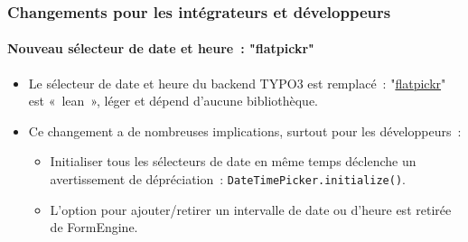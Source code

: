 %

\begin{frame}[fragile]
	\frametitle{Changements pour les intégrateurs et développeurs}
	\framesubtitle{Nouveau sélecteur de date et heure~: "flatpickr"}

	\lstset{basicstyle=\tiny\ttfamily}

	\begin{itemize}
		\item Le sélecteur de date et heure du backend TYPO3 est remplacé~:\newline
			"\href{https://flatpickr.js.org/}{flatpickr}"
			est «~lean~», léger et dépend d'aucune bibliothèque.
		\item Ce changement a de nombreuses implications, surtout pour les développeurs~:

			\begin{itemize}\small
				\item Initialiser tous les sélecteurs de date en même temps déclenche un avertissement de dépréciation~:\newline
					\texttt{DateTimePicker.initialize()}.
				\item L'option pour ajouter/retirer un intervalle de date ou d'heure est retirée de FormEngine.
			\end{itemize}

	\end{itemize}

\end{frame}

